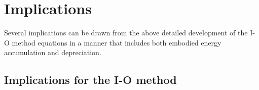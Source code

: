 %
%
%

\chapter{Implications}
\label{chap:implications}





Several implications can be drawn from the above detailed development of the I-O method equations in a manner that includes both embodied energy accumulation and depreciation.

\section{Implications for the I-O method}
\label{sec:Implications_for_IO}

